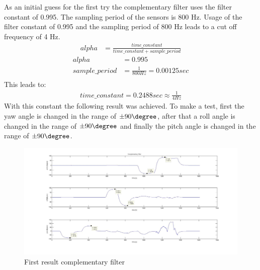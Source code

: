 As an initial guess for the first try the complementary filter uses the filter constant of 0.995. The sampling period of the sensors is 800 Hz. Usage of the filter constant of 0.995 and the sampling period of 800 Hz leads to a cut off frequency of 4 Hz. 
\begin{align}
alpha&=\frac{time\_constant}{time\_constant+sample\_period}
\label{equ:Comp2a}
\end{align}
\begin{align}
alpha&=0.995\\
sample\_period&=\frac{1}{800 Hz}=0.00125sec\\
\label{equ:Comp2b}
\end{align}
This leads to:
\begin{align}
time\_constant = 0.2488sec\approx \frac{1}{4 Hz}
\label{equ:Comp3}
\end{align}
With this constant the following result was achieved. To make a test, first the yaw angle is changed in the range of $\pm90 \degree$, after that a roll angle is changed in the range of $\pm90 \degree$ and finally the pitch angle is changed in the range of $\pm90 \degree$.

\begin{figure}[H]
	\centering\includegraphics[width=1.0\textwidth]{fig/Res_Kal_Comp/initial_Comp}
	\caption{First result complementary filter}
	\label{fig:initial_Comp}
\end{figure}

